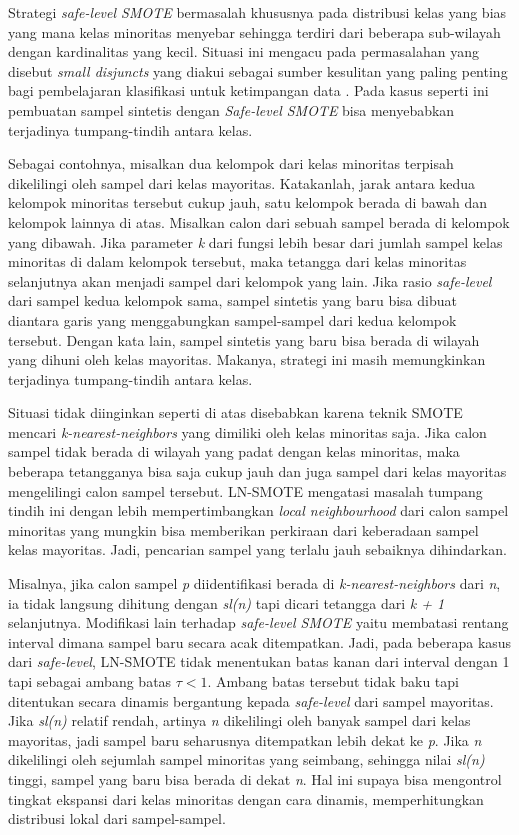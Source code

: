 Strategi \textit{safe-level SMOTE} bermasalah khususnya pada distribusi kelas yang bias yang mana kelas minoritas menyebar sehingga terdiri dari beberapa sub-wilayah dengan kardinalitas yang kecil.
Situasi ini mengacu pada permasalahan yang disebut \textit{small disjuncts} yang diakui sebagai sumber kesulitan yang paling penting bagi pembelajaran klasifikasi untuk ketimpangan data \cite{jo2004class}. 
Pada kasus seperti ini pembuatan sampel sintetis dengan \textit{Safe-level SMOTE} bisa menyebabkan terjadinya tumpang-tindih antara kelas.

Sebagai contohnya, misalkan dua kelompok dari kelas minoritas terpisah dikelilingi oleh sampel dari kelas mayoritas.
Katakanlah, jarak antara kedua kelompok minoritas tersebut cukup jauh, satu kelompok berada di bawah dan kelompok lainnya di atas.
Misalkan calon dari sebuah sampel berada di kelompok yang dibawah.
Jika parameter \textit{k} dari fungsi lebih besar dari jumlah sampel kelas minoritas di dalam kelompok tersebut, maka tetangga dari kelas minoritas selanjutnya akan menjadi sampel dari kelompok yang lain.
Jika rasio \textit{safe-level} dari sampel kedua kelompok sama, sampel sintetis yang baru bisa dibuat diantara garis yang menggabungkan sampel-sampel dari kedua kelompok tersebut.
Dengan kata lain, sampel sintetis yang baru bisa berada di wilayah yang dihuni oleh kelas mayoritas.
Makanya, strategi ini masih memungkinkan terjadinya tumpang-tindih antara kelas.

Situasi tidak diinginkan seperti di atas disebabkan karena teknik SMOTE mencari \textit{k-nearest-neighbors} yang dimiliki oleh kelas minoritas saja.
Jika calon sampel tidak berada di wilayah yang padat dengan kelas minoritas, maka beberapa tetangganya bisa saja cukup jauh dan juga sampel dari kelas mayoritas mengelilingi calon sampel tersebut.
LN-SMOTE mengatasi masalah tumpang tindih ini dengan lebih mempertimbangkan \textit{local neighbourhood} dari calon sampel minoritas yang mungkin bisa memberikan perkiraan dari keberadaan sampel kelas mayoritas.
Jadi, pencarian sampel yang terlalu jauh sebaiknya dihindarkan.

Misalnya, jika calon sampel \textit{p} diidentifikasi berada di \textit{k-nearest-neighbors} dari \textit{n}, ia tidak langsung dihitung dengan \textit{sl(n)} tapi dicari tetangga dari \textit{k + 1} selanjutnya.
Modifikasi lain terhadap \textit{safe-level SMOTE} yaitu membatasi rentang interval dimana sampel baru secara acak ditempatkan.
Jadi, pada beberapa kasus dari \textit{safe-level}, LN-SMOTE tidak menentukan batas kanan dari interval dengan 1 tapi sebagai ambang batas $\tau < 1$.
Ambang batas tersebut tidak baku tapi ditentukan secara dinamis bergantung kepada \textit{safe-level} dari sampel mayoritas.
Jika \textit{sl(n)} relatif rendah, artinya \textit{n} dikelilingi oleh banyak sampel dari kelas mayoritas, jadi sampel baru seharusnya ditempatkan lebih dekat ke \textit{p}.
Jika \textit{n} dikelilingi oleh sejumlah sampel minoritas yang seimbang, sehingga nilai \textit{sl(n)} tinggi, sampel yang baru bisa berada di dekat \textit{n}.
Hal ini supaya bisa mengontrol tingkat ekspansi dari kelas minoritas dengan cara dinamis, memperhitungkan distribusi lokal dari sampel-sampel.
